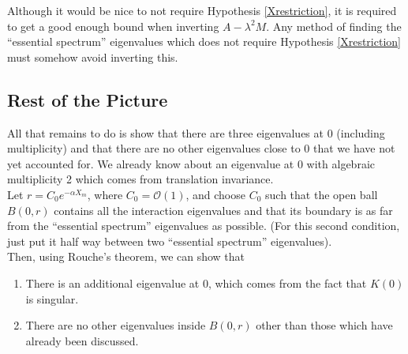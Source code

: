 \documentclass[12pt]{article}
\begin{document}
Although it would be nice to not require Hypothesis \ref{Xrestriction}, it is required to get a good enough bound when inverting $A - \lambda^2 M$. Any method of finding the ``essential spectrum'' eigenvalues which does not require Hypothesis \ref{Xrestriction} must somehow avoid inverting this. 

\subsection{Rest of the Picture}

All that remains to do is show that there are three eigenvalues at 0 (including multiplicity) and that there are no other eigenvalues close to 0 that we have not yet accounted for. We already know about an eigenvalue at 0 with algebraic multiplicity 2 which comes from translation invariance.\\

Let $r = C_0 e^{-\alpha X_m}$, where $C_0 = \mathcal{O}(1)$, and choose $C_0$ such that the open ball $B(0, r)$ contains all the interaction eigenvalues and that its boundary is as far from the ``essential spectrum'' eigenvalues as possible. (For this second condition, just put it half way between two ``essential spectrum'' eigenvalues).\\

Then, using Rouche's theorem, we can show that

\begin{enumerate}
\item There is an additional eigenvalue at 0, which comes from the fact that $K(0)$ is singular.
\item There are no other eigenvalues inside $B(0, r)$ other than those which have already been discussed.
\end{enumerate}
\end{document}
